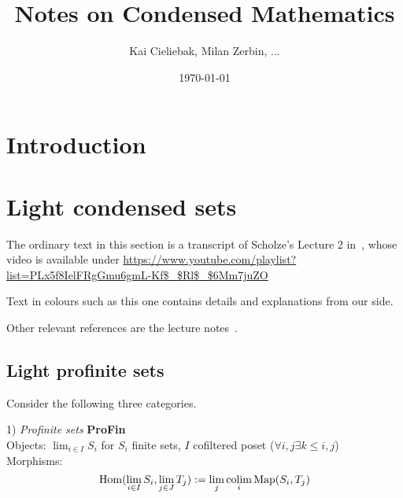 \documentclass{notes}
\begin{document}
\title{Notes on Condensed Mathematics} 
\author{Kai Cieliebak, Milan Zerbin, ...}
\date{\today}



\maketitle


\section{Introduction}\label{sec:intro}

\section{Light condensed sets}\label{sec:light-condensed-sets}

The ordinary text in this section is a transcript of Scholze's Lecture
2 in~\cite{videos}, whose video is available under
\url{https://www.youtube.com/playlist?list=PLx5f8IelFRgGmu6gmL-Kf$\_$Rl$\_$6Mm7juZO}

Text in colours such as {\kai this one} contains details and
explanations from our side. 

Other relevant references are the lecture
notes~\cite{analytic,condensed,complex}. 

\subsection{Light profinite sets}

Consider the following three categories.

1) {\em Profinite sets} {\bf ProFin} \\
Objects: $\lim_{i\in I}S_i$ for $S_i$ finite sets, $I$ cofiltered poset
($\forall i,j \exists k\leq i,j$)
\\
Morphisms: 
$$
  \mathrm{Hom}(\lim_{i\in I}S_i,\lim_{j\in J}T_j) := \lim_j\operatorname*{colim}_i{\rm Map}(S_i,T_j)
$$
\end{document}
